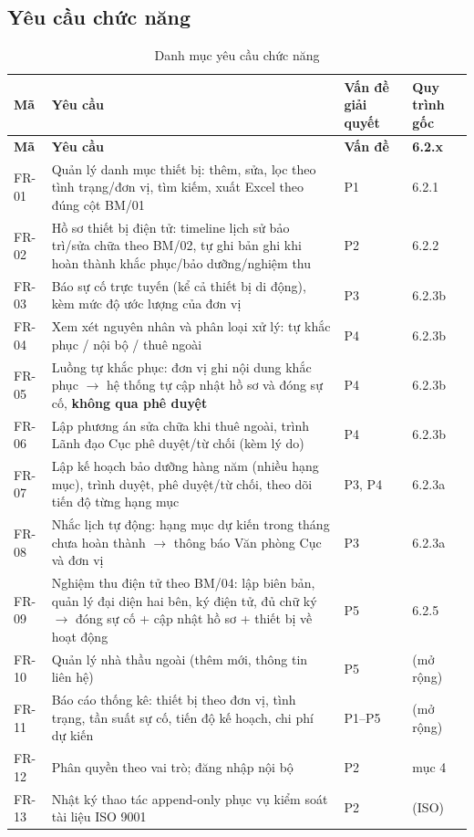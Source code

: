 \subsection{Yêu cầu chức năng}

\begin{longtable}{P{1.6cm}P{8.6cm}P{2cm}P{2.6cm}}
\caption{Danh mục yêu cầu chức năng}\label{tab:fr}\\
\toprule
\textbf{Mã} & \textbf{Yêu cầu} & \textbf{Vấn đề giải quyết} & \textbf{Quy trình gốc} \\
\midrule
\endfirsthead
\toprule
\textbf{Mã} & \textbf{Yêu cầu} & \textbf{Vấn đề} & \textbf{6.2.x} \\
\midrule
\endhead
FR-01 & Quản lý danh mục thiết bị: thêm, sửa, lọc theo tình trạng/đơn vị, tìm kiếm, xuất Excel theo đúng cột BM/01 & P1 & 6.2.1 \\
FR-02 & Hồ sơ thiết bị điện tử: timeline lịch sử bảo trì/sửa chữa theo BM/02, tự ghi bản ghi khi hoàn thành khắc phục/bảo dưỡng/nghiệm thu & P2 & 6.2.2 \\
FR-03 & Báo sự cố trực tuyến (kể cả thiết bị di động), kèm mức độ ước lượng của đơn vị & P3 & 6.2.3b \\
FR-04 & Xem xét nguyên nhân và phân loại xử lý: tự khắc phục / nội bộ / thuê ngoài & P4 & 6.2.3b \\
FR-05 & Luồng tự khắc phục: đơn vị ghi nội dung khắc phục $\rightarrow$ hệ thống tự cập nhật hồ sơ và đóng sự cố, \textbf{không qua phê duyệt} & P4 & 6.2.3b \\
FR-06 & Lập phương án sửa chữa khi thuê ngoài, trình Lãnh đạo Cục phê duyệt/từ chối (kèm lý do) & P4 & 6.2.3b \\
FR-07 & Lập kế hoạch bảo dưỡng hàng năm (nhiều hạng mục), trình duyệt, phê duyệt/từ chối, theo dõi tiến độ từng hạng mục & P3, P4 & 6.2.3a \\
FR-08 & Nhắc lịch tự động: hạng mục dự kiến trong tháng chưa hoàn thành $\rightarrow$ thông báo Văn phòng Cục và đơn vị & P3 & 6.2.3a \\
FR-09 & Nghiệm thu điện tử theo BM/04: lập biên bản, quản lý đại diện hai bên, ký điện tử, đủ chữ ký $\rightarrow$ đóng sự cố + cập nhật hồ sơ + thiết bị về hoạt động & P5 & 6.2.5 \\
FR-10 & Quản lý nhà thầu ngoài (thêm mới, thông tin liên hệ) & P5 & (mở rộng) \\
FR-11 & Báo cáo thống kê: thiết bị theo đơn vị, tình trạng, tần suất sự cố, tiến độ kế hoạch, chi phí dự kiến & P1--P5 & (mở rộng) \\
FR-12 & Phân quyền theo vai trò; đăng nhập nội bộ & P2 & mục 4 \\
FR-13 & Nhật ký thao tác append-only phục vụ kiểm soát tài liệu ISO 9001 & P2 & (ISO) \\
\bottomrule
\end{longtable}

